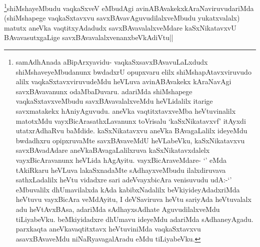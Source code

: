 \begin{artha}
\footnote{samAdhAnada aBipArxyavidu- vaqkaSxsavxBAvavuLaLxdudx shiMshaveyeMbudanunx bwdadxrU opupxvaru elilx shiMshapAtavxviruvudo alilx vaqkaSxtavxviruvudeMdu heVLuva avinABAvakekx kAraNavAgi savxBAvavanunx odaMbaDuvaru. adariMda shiMshapege vaqkaSxtavxveMbudu savxBAvavalalxveMdu heVLidalilx itarige savxmatakekx hAniyAguvudu. aneVka vaqtitxtavxveMba heVtuvinalilx matotxMdu vayxBicArasathxLavanunx toVrisalu `kaSxNikatavxvf' itAyxdi utatxrAdhaRvu baMdide. kaSxNikatavxvu aneVka BAvagaLalilx ideyeMdu bwdadhxru opipxruvaMte savxBAvaveMdU heVLabeVku, kaSxNikatavxvu savxBAvadAdare aneVkaBAvagaLalilxruva kaSxNikatavxdalelx vayxBicAravanunx heVLida hAgAyitu. vayxBicAraveMdare- `\stext' eMda tAkiRkaru heVLuva lakaSxnadaMte sAdhayxveMbudu ilalxdiruvava sathxLadalilx heVtu vidadxre sari adeVvayxbicAra venisuvudu udA:-`\stext' eMbuvalilx dhUmavilalxda kAda kabibxNadalilx beVkiyideyAdadxriMda heVtuvu vayxBicAra veMdAyitu, I deVSaviruva heVtu sariyAda heVtuvalalx adu heVtAvxBAsa, adariMda sAdhayxsAdhate AguvudilalxveMdu tiLiyabeVku. beMkiyidadxre dhUmavu ideyeMdu adariMda sAdhaneyAgadu. parxkaqta aneVkavaqtitxtavx heVtuviniMda vaqkaSxtavxvu asavxBAvaveMdu niNaRyavagalAradu eMdu tiLiyabeVku.}shiMshayeMbudu vaqkaSxveV eMbudAgi avinABAvakekxkAraNaviruvudariMda (shiMshapege vaqkaSxtavxvu savxBAvavAguvudilalxveMbudu yukatxvalalx) matutx aneVka vaqtitxyAdadudx savxBAvavalalxveMdare kaSxNikatavxvU BAvavasutxgaLige savxBAvavalalxvenanxbeVkAdiVtu||
\end{artha}




